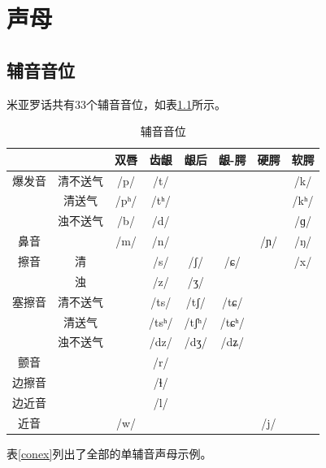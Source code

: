 \chapter{声母}\label{charonset}

\section{辅音音位}

米亚罗话共有33个辅音音位，如表\ref{consonant}所示。

\begin{table}[H]
\vspace{5pt}
    \centering
    \caption{辅音音位}
    \label{consonant}
\begin{tabular}{cccccccc}
    
   \toprule
     & & 双唇 & 齿龈 & 龈后 & 龈-腭 & 硬腭 & 软腭 \\
   \midrule
   爆发音 & 清不送气 & /p/ & /t/ &  & & & /k/ \\
    & 清送气 & /pʰ/ & /tʰ/ &  & & & /kʰ/ \\
    & 浊不送气 & /b/ & /d/ &  & & & /ɡ/ \\
    鼻音 & & /m/ & /n/ &  & & /ɲ/ & /ŋ/ \\
    擦音 & 清 &  & /s/ & /ʃ/ & /ɕ/ & & /x/ \\
     & 浊 &  & /z/ & /ʒ/ & & &  \\
    塞擦音 & 清不送气 &  & /ts/ & /tʃ/ & /tɕ/ & &  \\
    & 清送气 &  & /tsʰ/ & /tʃʰ/ & /tɕʰ/ & &  \\
    & 浊不送气 & & /dz/ & /dʒ/ & /dʑ/ & &  \\
    颤音 & &  & /r/ &  &  & &  \\
    边擦音 & &  & /ɬ/ &  &  & &  \\
    边近音 & &  & /l/ &  &  & &  \\
    近音 & & /w/ &  &  &  & /j/ &  \\
   \bottomrule
\end{tabular}
\end{table}

表\ref{conex}列出了全部的单辅音声母示例。

